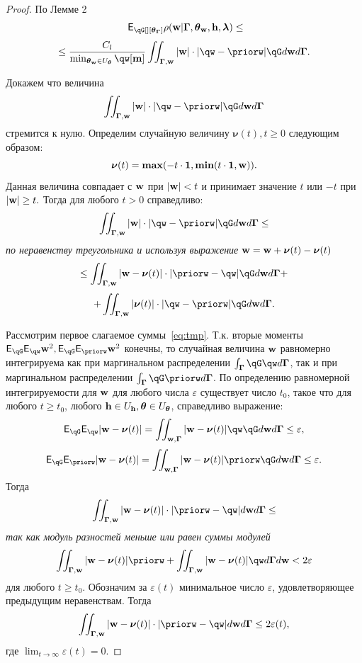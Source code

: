 \begin{proof}

По Лемме 2
\[
    \E_{\qG[][{\tetaG}]} {\rho}(\w|\G, {\tetaw}, {\h}, \lam)  \leq
\]
\[
\leq  \frac{C_l}{\min_{\tetaw \in \Uteta} \qw[\mathbf{m}]}  \iint_{\G,\w} |\w| \cdot |\qw - \priorw|\qG d\w d\G.
\]

Докажем что величина
\[
    \iint_{\G,\w} |\w| \cdot |\qw - \priorw|\qG d\w d\G
\]
стремится к нулю.
Определим случайную величину $\boldsymbol{\nu}(t), t \geq 0$ следующим образом:
\[
    \boldsymbol{\nu}(t) = \boldsymbol{\max}(-t \cdot \mathbf{1}, \boldsymbol{\min}(t \cdot \mathbf{1}, \mathbf{w})).
\]
Данная величина совпадает с $\mathbf{w}$ при $|\mathbf{w}| < t$ и принимает значение $t$ или $-t$ при $|\mathbf{w}| \geq t.$
Тогда для любого $t>0$ справедливо:
\[
    \iint_{\G,\w} |\w| \cdot |\qw - \priorw|\qG d\w d\G \leq
\]
\textit{по неравенству треугольника и используя выражение }$\mathbf{w} = \mathbf{w} + \boldsymbol{\nu}(t) -\boldsymbol{\nu}(t)$
\begin{equation}
\label{eq:tmp}
    \leq    \iint_{\G,\w} |\w -\boldsymbol{\nu}(t)| \cdot |\priorw -\qw|\qG d\w d\G   +
\end{equation}
\[ +      \iint_{\G,\w} |\boldsymbol{\nu}(t)| \cdot |\qw - \priorw|\qG d\w d\G.
\]




Рассмотрим первое слагаемое суммы~\eqref{eq:tmp}. Т.к. вторые моменты $\E_{\qG}\E_{\qw} \w^2, \E_{\qG}\E_{\priorw} \w^2$ конечны, то случайная величина $\mathbf{w}$ равномерно интегрируема как при маргинальном распределении $\int_{\G}\qG\qw d\G$, так и при маргинальном распределении $\int_{\G}\qG\priorw d\G$.
По определению равномерной интегрируемости для $\mathbf{w}$ для любого числа $\varepsilon$ существует число $t_0$, такое что для любого $t \geq t_0$, любого $\mathbf{h} \in U_{\mathbf{h}}, \boldsymbol{\theta} \in U_{\boldsymbol{\theta}}$,  справедливо выражение:
\[
    \E_{\qG}\E_{\qw}|\w - \boldsymbol{\nu}(t)| = \iint_{\w,\G}|\w - \boldsymbol{\nu}(t)|\qw\qG d\w d\G \leq \varepsilon,
\]
\[
    \E_{\qG}\E_{\priorw}|\w - \boldsymbol{\nu}(t)| = \iint_{\w,\G}|\w - \boldsymbol{\nu}(t)|\priorw\qG d\w d\G \leq \varepsilon.
\]
Тогда
\[
   \iint_{\G,\w} |\w -\boldsymbol{\nu}(t)|\cdot|\priorw  - \qw| d\w d\G   \leq  
\]
\textit{так как модуль разностей меньше или равен суммы модулей}
\[
  \iint_{\G,\w} |\w -\boldsymbol{\nu}(t)|\priorw  +   \iint_{\G,\w} |\w -\boldsymbol{\nu}(t)|\qw d\G d\w < 2 \varepsilon
\]
для любого $t \geq t_0$. Обозначим за $\varepsilon(t)$ минимальное число $\varepsilon$, удовлетворяющее предыдущим неравенствам. Тогда
$$
 \iint_{\G,\w} |\w -\boldsymbol{\nu}(t)|\cdot|\priorw  - \qw| d\w d\G  \leq 2 \varepsilon(t),
$$
где $\lim_{t \to \infty} \varepsilon(t) = 0$.


\end{proof}
